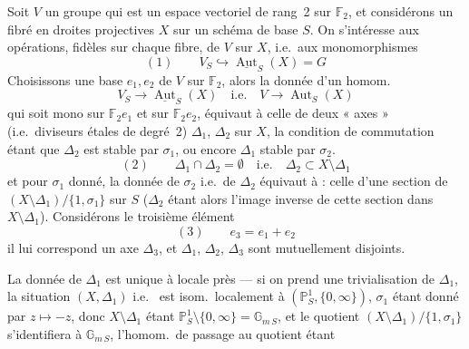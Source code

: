 \documentclass[11pt,a4paper]{article}
\begin{document}
Soit $V$ un groupe qui est un espace vectoriel de rang~2 sur $\mathbb{F}_2$,
et considérons un  fibré en droites projectives $X$
sur un schéma de base $S$. On s'intéresse aux opérations, fidèles sur chaque
fibre, de $V$ sur $X$, i.e.\ aux monomorphismes
\[
  (1) \qquad V_S \hookrightarrow \underline{\operatorname{Aut}}_S(X) = G
\]
Choisissons une base $e_1, e_2$ de $V$ sur $\mathbb{F}_2$, alors la donnée d'un
homom.
\[
  V_S \longrightarrow \underline{\operatorname{Aut}}_S(X) \quad \text{i.e.}\quad
  V \longrightarrow \operatorname{Aut}_S(X)
\]
qui soit mono sur $\mathbb{F}_2 e_1$ et sur $\mathbb{F}_2 e_2$, équivaut à
celle de 
deux « axes » (i.e.\ diviseurs étales de degré~2) $\Delta_1$, $\Delta_2$ sur
$X$, la condition de commutation étant que $\Delta_2$ est stable par $\sigma_1$,
ou encore $\Delta_1$ stable par $\sigma_2$.
\[
  (2) \qquad \Delta_1 \cap \Delta_2 = \emptyset \quad \text{i.e.}\quad
  \Delta_2 \subset X \setminus \Delta_1
\]
et pour $\sigma_1$  donné, la donnée de
\struck{\ill{}} $\sigma_2$ i.e.\ de $\Delta_2$ équivaut à : celle d'une section
de  $(X \setminus \Delta_1)/\{1, \sigma_1\}$
sur $S$ ($\Delta_2$ étant alors l'image inverse de cette section dans
$X \setminus \Delta_1$). Considérons le troisième élément
\[
  (3) \qquad e_3 = e_1 + e_2
\]
il lui correspond un axe $\Delta_3$, et $\Delta_1$, $\Delta_2$, $\Delta_3$ sont
mutuellement disjoints.

La donnée de $\Delta_1$ est unique à  locale près
\struck{\ill{}} --- si on prend une trivialisation de $\Delta_1$,
 la situation $(X, \Delta_1)$ i.e.\ \struck{\ill{}} est
isom.\ localement à $(\mathbb{P}^1_S, \{0, \infty\})$, $\sigma_1$ étant donné
par $z \mapsto -z$, donc $X \setminus \Delta_1$ étant
$\mathbb{P}^1_S \setminus \{0, \infty\} = \mathbb{G}_{m\,S}$, et le quotient
$(X \setminus \Delta_1)/\{1, \sigma_1\}$ s'identifiera à $\mathbb{G}_{m\,S}$,
l'homom.\ de passage au quotient étant
\end{document}
